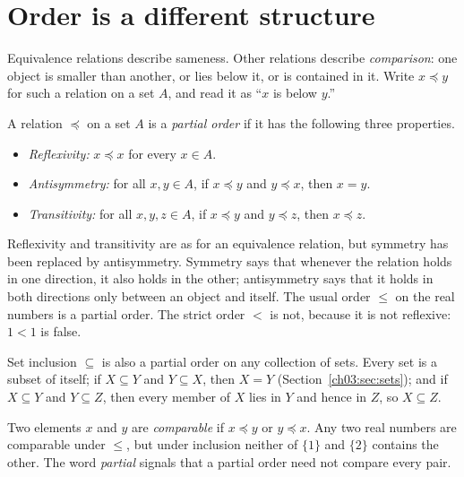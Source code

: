 \section{Order is a different structure}\label{ch06:sec:order}
Equivalence relations describe sameness. Other relations describe \emph{comparison}: one object is smaller than another, or lies below it, or is contained in it. Write $x\preceq y$ for such a relation on a set $A$, and read it as ``$x$ is below $y$.''

\par\noindent\begin{minipage}{\linewidth}
\begin{definition}\label{ch06:def:partial-order}
A relation $\preceq$ on a set $A$ is a \emph{partial order} if it has the following three properties.
\begin{itemize}
\item \emph{Reflexivity:} $x\preceq x$ for every $x\in A$.
\item \emph{Antisymmetry:} for all $x,y\in A$, if $x\preceq y$ and $y\preceq x$, then $x=y$.
\item \emph{Transitivity:} for all $x,y,z\in A$, if $x\preceq y$ and $y\preceq z$, then $x\preceq z$.
\end{itemize}
\end{definition}
\end{minipage}\par

Reflexivity and transitivity are as for an equivalence relation, but symmetry has been replaced by antisymmetry. Symmetry says that whenever the relation holds in one direction, it also holds in the other; antisymmetry says that it holds in both directions only between an object and itself. The usual order $\le$ on the real numbers is a partial order. The strict order $<$ is not, because it is not reflexive: $1<1$ is false.

Set inclusion $\subseteq$ is also a partial order on any collection of sets. Every set is a subset of itself; if $X\subseteq Y$ and $Y\subseteq X$, then $X=Y$ (Section~\ref{ch03:sec:sets}); and if $X\subseteq Y$ and $Y\subseteq Z$, then every member of $X$ lies in $Y$ and hence in $Z$, so $X\subseteq Z$.

Two elements $x$ and $y$ are \emph{comparable} if $x\preceq y$ or $y\preceq x$. Any two real numbers are comparable under $\le$, but under inclusion neither of $\{1\}$ and $\{2\}$ contains the other. The word \emph{partial} signals that a partial order need not compare every pair.


